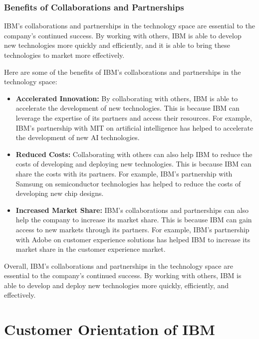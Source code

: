 \subsubsection{Benefits of Collaborations and Partnerships}

IBM's collaborations and partnerships in the technology space are essential to the company's continued success. By working with others, IBM is able to develop new technologies more quickly and efficiently, and it is able to bring these technologies to market more effectively.

Here are some of the benefits of IBM's collaborations and partnerships in the technology space:

\begin{itemize}
  \item \textbf{Accelerated Innovation:} By collaborating with others, IBM is able to accelerate the development of new technologies. This is because IBM can leverage the expertise of its partners and access their resources. For example, IBM's partnership with MIT on artificial intelligence has helped to accelerate the development of new AI technologies.
  
  \item \textbf{Reduced Costs:} Collaborating with others can also help IBM to reduce the costs of developing and deploying new technologies. This is because IBM can share the costs with its partners. For example, IBM's partnership with Samsung on semiconductor technologies has helped to reduce the costs of developing new chip designs.
  
  \item \textbf{Increased Market Share:} IBM's collaborations and partnerships can also help the company to increase its market share. This is because IBM can gain access to new markets through its partners. For example, IBM's partnership with Adobe on customer experience solutions has helped IBM to increase its market share in the customer experience market.
\end{itemize}

Overall, IBM's collaborations and partnerships in the technology space are essential to the company's continued success. By working with others, IBM is able to develop and deploy new technologies more quickly, efficiently, and effectively.


\section{Customer Orientation of IBM}

